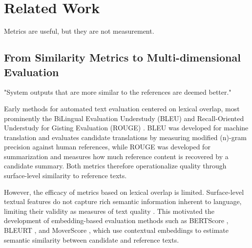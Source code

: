 
\section{Related Work}

Metrics are useful, but they are not measurement.

\subsection{From Similarity Metrics to Multi-dimensional Evaluation}

"System outputs that are more similar to the references are deemed better." \citep{gehrmann2023repairing}


Early methods for automated text evaluation centered on lexical overlap, most prominently the BiLingual Evaluation Understudy (BLEU) \citep{papineni_bleu_2001} and Recall-Oriented Understudy for Gisting Evaluation (ROUGE) \citep{lin_rouge_2004}. BLEU was developed for machine translation and evaluates candidate translations by measuring modified (n)-gram precision against human references, while ROUGE was developed for summarization and measures how much reference content is recovered by a candidate summary. Both metrics therefore operationalize quality through surface-level similarity to reference texts.




However, the efficacy of metrics based on lexical overlap is limited. Surface-level textual features do not capture rich semantic information inherent to language, limiting their validity as measures of text quality \citep{reiter2018structured}. This motivated the development of embedding-based evaluation methods such as BERTScore \citep{zhang_bertscore_2020}, BLEURT \citep{sellam_bleurt_2020}, and MoverScore \citep{zhao_moverscore_2019}, which use contextual embeddings to estimate semantic similarity between candidate and reference texts.

